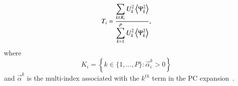 %

\begin{equation} \label{eq:T-hard}
   T_i =
         \frac{\displaystyle
               \sum_{k \in K_i} U_k^2 \left\langle {\Psi_k^2} \right\rangle}
              {\displaystyle\sum_{k = 1}^P U_k^2 \left\langle {\Psi_k^2} \right\rangle},
\end{equation}
where \[
   K_i = \left\{ k \in \{1, \ldots, P\} :
           \vec{\alpha}^k_i > 0 \right\}
        \]
        and $\vec{\alpha}^k$ is the multi-index associated with the $k^{th}$ term in the
PC expansion~\cite{LeMaitreKnio2010}.



